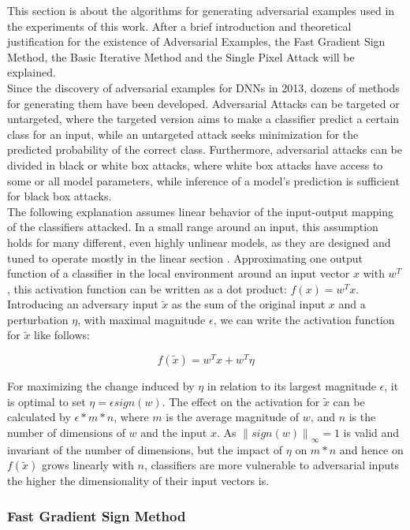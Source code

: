 \documentclass[draft,final]{vutinfth} %
\newcommand{\norm}[1]{\left\lVert#1\right\rVert}
\begin{document}
This section is about the algorithms for generating adversarial examples used in the experiments of this work.
After a brief introduction and theoretical justification for the existence of Adversarial Examples, the Fast Gradient Sign Method, the Basic Iterative Method and the Single Pixel Attack will be explained.\\
Since the discovery of adversarial examples for DNNs in 2013, dozens of methods for generating them have been developed.
Adversarial Attacks can be targeted or untargeted, where the targeted version aims to make a classifier predict a certain class for an input, while an untargeted attack seeks minimization for the predicted probability of the correct class.
Furthermore, adversarial attacks can be divided in black or white box attacks, where white box attacks have access to some or all model parameters, while inference of a model's prediction is sufficient for black box attacks.
\\
The following explanation assumes linear behavior of the input-output mapping of the classifiers attacked.
In a small range around an input, this assumption holds for many different, even highly unlinear models, as they are designed and tuned to operate mostly in the linear section \cite{Goodfellow2015}.
Approximating one output function of a classifier in the local environment around an input vector $x$ with $w^T$, this activation function can be written as a dot product: $f(x) = w^Tx$.
Introducing an adversary input $\tilde{x}$ as the sum of the original input $x$ and a perturbation $\eta$, with maximal magnitude $\epsilon$, we can write the activation function for $\tilde{x}$ like follows:

\begin{equation}
	f(\tilde{x}) = w^Tx + w^T\eta
\end{equation}

For maximizing the change induced by $\eta$ in relation to its largest magnitude $\epsilon$, it is optimal to set $\eta = \epsilon sign(w)$.
The effect on the activation for $\tilde{x}$ can be calculated by $\epsilon*m*n$, where $m$ is the average magnitude of $w$, and $n$ is the number of dimensions of $w$ and the input $x$.
As $\norm{sign(w)}_\infty = 1$ is valid and invariant of the number of dimensions, but the impact of $\eta$ on $m*n$ and hence on $f(\tilde{x})$ grows linearly with $n$, classifiers are more vulnerable to adversarial inputs the higher the dimensionality of their input vectors is. \cite{Goodfellow2015}

\subsubsection{Fast Gradient Sign Method}
\end{document}
